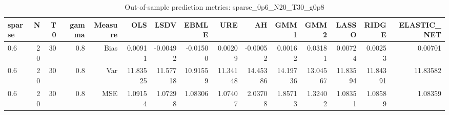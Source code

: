 \begin{table}[!htbp]\centering
\caption{Out-of-sample prediction metrics: sparse_0p6_N20_T30_g0p8}
\label{tab:table3_sparse_0p6_N20_T30_g0p8}
\begin{tabular}{lrrrrrrrrrrrrrr}
\hline
sparse & N & T0 & gamma & Measure & OLS & LSDV & EBMLE & URE & AH & GMM1 & GMM2 & LASSO & RIDGE & ELASTIC_NET \\
\hline
0.6 & 20 & 30 & 0.8 & Bias & 0.00911 & -0.00492 & -0.01500 & 0.00209 & -0.00052 & 0.00162 & 0.03181 & 0.00724 & 0.00253 & 0.00701 \\
0.6 & 20 & 30 & 0.8 & Var & 11.83525 & 11.57718 & 10.91559 & 11.34148 & 14.45386 & 14.19736 & 13.04567 & 11.83594 & 11.84391 & 11.83582 \\
0.6 & 20 & 30 & 0.8 & MSE & 1.09154 & 1.07298 & 1.08306 & 1.07407 & 2.03708 & 1.85713 & 1.32402 & 1.08351 & 1.08589 & 1.08359 \\
\hline
\end{tabular}
\end{table}

